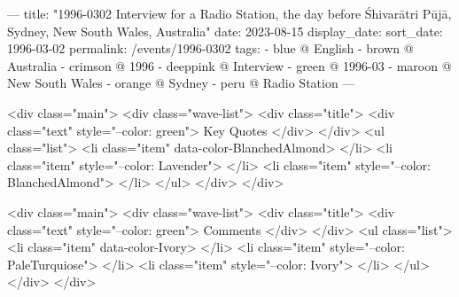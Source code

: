 ---
title: "1996-0302 Interview for a Radio Station, the day before Śhivarātri Pūjā, Sydney, New South Wales, Australia"
date: 2023-08-15
display_date: 
sort_date: 1996-03-02
permalink: /events/1996-0302
tags:
  - blue @ English
  - brown @ Australia
  - crimson @ 1996
  - deeppink @ Interview
  - green @ 1996-03
  - maroon @ New South Wales
  - orange @ Sydney
  - peru @ Radio Station
---

<div class="main">
  <div class="wave-list">
    <div class="title">
      <div class="text" style="--color: green">
        Key Quotes
      </div>
    </div>
    <ul class="list">
        <li class="item" data-color-BlanchedAlmond>
        </li>
        <li class="item" style="--color: Lavender">
        </li>
        <li class="item" style="--color: BlanchedAlmond">
        </li>
      </ul>
  </div>
</div>

<div class="main">
  <div class="wave-list">
    <div class="title">
      <div class="text" style="--color: green">
        Comments
      </div>
    </div>
    <ul class="list">
        <li class="item" data-color-Ivory>
        </li>
        <li class="item" style="--color: PaleTurquiose">
        </li>
        <li class="item" style="--color: Ivory">
        </li>
      </ul>
  </div>
</div>